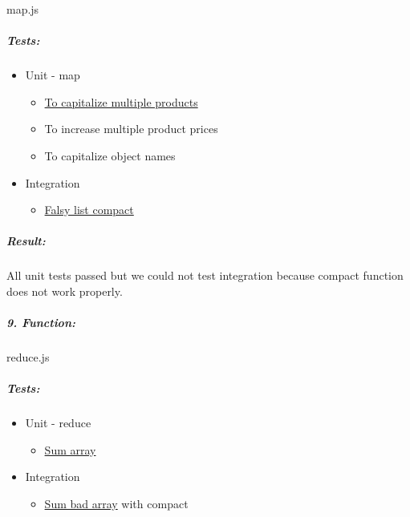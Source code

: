 \documentclass[a4paper, 12pt]{article}
\begin{document}
		map.js
		
		\hypertarget{header-n290}{%
		\subparagraph{Tests:}\label{header-n290}}
		
		\begin{itemize}
		\item
		Unit - map
		
		\begin{itemize}
			\item
			\underline{To capitalize multiple products}
			\item
			To increase multiple product prices
			\item
			To capitalize object names
		\end{itemize}
		\item
		Integration
		
		\begin{itemize}
			\item
			\underline{Falsy list compact}
		\end{itemize}
		\end{itemize}
		
		\hypertarget{header-n303}{%
		\subparagraph{Result:}\label{header-n303}}
		
		All unit tests passed but we could not test integration because compact
		function does not work properly.


		
		\hypertarget{header-n423}{%
		\subparagraph{9. Function:}\label{header-n423}}
		
		reduce.js
		
		\hypertarget{header-n425}{%
		\subparagraph{Tests:}\label{header-n425}}
		
		\begin{itemize}
		\item
		Unit - reduce
		
		\begin{itemize}
			\item
			\underline{Sum array}
		\end{itemize}
		\end{itemize}
		
		\begin{itemize}
		\item
		Integration
		
		\begin{itemize}
			\item
			\underline{Sum bad array} with compact
		\end{itemize}
		\end{itemize}
		
\end{document}
